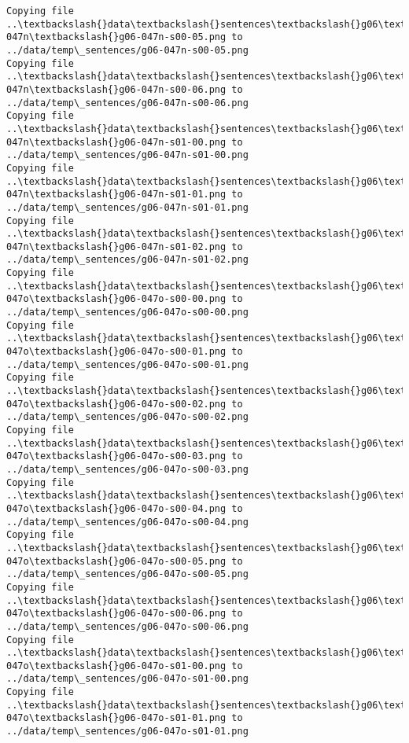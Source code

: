 \documentclass[11pt]{article}
\begin{document}
\begin{Verbatim}[commandchars=\\\{\}]
Copying file ..\textbackslash{}data\textbackslash{}sentences\textbackslash{}g06\textbackslash{}g06-047n\textbackslash{}g06-047n-s00-05.png to
../data/temp\_sentences/g06-047n-s00-05.png
Copying file ..\textbackslash{}data\textbackslash{}sentences\textbackslash{}g06\textbackslash{}g06-047n\textbackslash{}g06-047n-s00-06.png to
../data/temp\_sentences/g06-047n-s00-06.png
Copying file ..\textbackslash{}data\textbackslash{}sentences\textbackslash{}g06\textbackslash{}g06-047n\textbackslash{}g06-047n-s01-00.png to
../data/temp\_sentences/g06-047n-s01-00.png
Copying file ..\textbackslash{}data\textbackslash{}sentences\textbackslash{}g06\textbackslash{}g06-047n\textbackslash{}g06-047n-s01-01.png to
../data/temp\_sentences/g06-047n-s01-01.png
Copying file ..\textbackslash{}data\textbackslash{}sentences\textbackslash{}g06\textbackslash{}g06-047n\textbackslash{}g06-047n-s01-02.png to
../data/temp\_sentences/g06-047n-s01-02.png
Copying file ..\textbackslash{}data\textbackslash{}sentences\textbackslash{}g06\textbackslash{}g06-047o\textbackslash{}g06-047o-s00-00.png to
../data/temp\_sentences/g06-047o-s00-00.png
Copying file ..\textbackslash{}data\textbackslash{}sentences\textbackslash{}g06\textbackslash{}g06-047o\textbackslash{}g06-047o-s00-01.png to
../data/temp\_sentences/g06-047o-s00-01.png
Copying file ..\textbackslash{}data\textbackslash{}sentences\textbackslash{}g06\textbackslash{}g06-047o\textbackslash{}g06-047o-s00-02.png to
../data/temp\_sentences/g06-047o-s00-02.png
Copying file ..\textbackslash{}data\textbackslash{}sentences\textbackslash{}g06\textbackslash{}g06-047o\textbackslash{}g06-047o-s00-03.png to
../data/temp\_sentences/g06-047o-s00-03.png
Copying file ..\textbackslash{}data\textbackslash{}sentences\textbackslash{}g06\textbackslash{}g06-047o\textbackslash{}g06-047o-s00-04.png to
../data/temp\_sentences/g06-047o-s00-04.png
Copying file ..\textbackslash{}data\textbackslash{}sentences\textbackslash{}g06\textbackslash{}g06-047o\textbackslash{}g06-047o-s00-05.png to
../data/temp\_sentences/g06-047o-s00-05.png
Copying file ..\textbackslash{}data\textbackslash{}sentences\textbackslash{}g06\textbackslash{}g06-047o\textbackslash{}g06-047o-s00-06.png to
../data/temp\_sentences/g06-047o-s00-06.png
Copying file ..\textbackslash{}data\textbackslash{}sentences\textbackslash{}g06\textbackslash{}g06-047o\textbackslash{}g06-047o-s01-00.png to
../data/temp\_sentences/g06-047o-s01-00.png
Copying file ..\textbackslash{}data\textbackslash{}sentences\textbackslash{}g06\textbackslash{}g06-047o\textbackslash{}g06-047o-s01-01.png to
../data/temp\_sentences/g06-047o-s01-01.png

\end{Verbatim}
\end{document}
